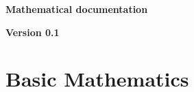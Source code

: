 \documentclass[11pt,twoside]{book}
\theoremstyle{definition}
\theoremstyle{remark}
\begin{document}
\begin{titlepage}
\thispagestyle{empty}
\begin{center}
   {\huge \bf Mathematical documentation}
\end{center}
\begin{center}
    {\bf Version 0.1}
\end{center}
\end{titlepage}

\glsaddall

\tableofcontents
{}



\part{Basic Mathematics}













%
%
%
%
%
%
%
%

%
%

%
%
\end{document}
